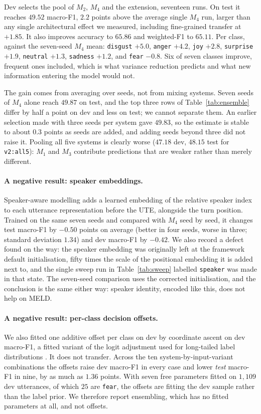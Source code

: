 \documentclass[sigconf,nonacm]{acmart}
\begin{document}
Dev selects the pool of $M_2$, $M_4$ and the extension, seventeen runs. On test it reaches
$49.52$ macro-F1, $2.2$ points above the average single $M_4$ run, larger than any single
architectural effect we measured, including fine-grained transfer at $+1.85$. It also
improves accuracy to $65.86$ and weighted-F1 to $65.11$. Per class, against the seven-seed
$M_4$ mean: \texttt{disgust} $+5.0$, \texttt{anger} $+4.2$, \texttt{joy} $+2.8$,
\texttt{surprise} $+1.9$, \texttt{neutral} $+1.3$, \texttt{sadness} $+1.2$, and
\texttt{fear} $-0.8$. Six of seven classes improve, frequent ones included, which is what
variance reduction predicts and what new information entering the model would not.

The gain comes from averaging over seeds, not from mixing systems. Seven seeds of $M_4$
alone reach $49.87$ on test, and the top three rows of Table~\ref{tab:ensemble} differ by
half a point on dev and less on test; we cannot separate them. An earlier selection made
with three seeds per system gave $49.83$, so the estimate is stable to about $0.3$ points
as seeds are added, and adding seeds beyond three did not raise it. Pooling all five
systems is clearly worse ($47.18$ dev, $48.15$ test for \texttt{v2:all5}): $M_1$ and
$M_3$ contribute predictions that are weaker rather than merely different.

\paragraph{A negative result: speaker embeddings.}
Speaker-aware modelling adds a learned embedding of the relative speaker index to each
utterance representation before the UTE, alongside the turn position. Trained on the same
seven seeds and compared with $M_4$ seed by seed, it changes test macro-F1 by $-0.50$
points on average (better in four seeds, worse in three; standard deviation $1.34$) and dev
macro-F1 by $-0.42$. We also record a defect found on the way: the speaker embedding was
originally left at the framework default initialisation, fifty times the scale of the
positional embedding it is added next to, and the single sweep run in
Table~\ref{tab:sweep} labelled \texttt{speaker} was made in that state. The seven-seed
comparison uses the corrected initialisation, and the conclusion is the same either way:
speaker identity, encoded like this, does not help on MELD.

\paragraph{A negative result: per-class decision offsets.}
We also fitted one additive offset per class on dev by coordinate ascent on dev macro-F1,
a fitted variant of the logit adjustment used for long-tailed label distributions
\citep{menon2020logit}. It does not transfer. Across the ten
system-by-input-variant combinations the offsets raise dev macro-F1 in every case and lower
\emph{test} macro-F1 in nine, by as much as $1.36$ points. With seven free parameters fitted
on $1{,}109$ dev utterances, of which $25$ are \texttt{fear}, the offsets are fitting the dev
sample rather than the label prior. We therefore report ensembling, which has no fitted
parameters at all, and not offsets.
\end{document}
